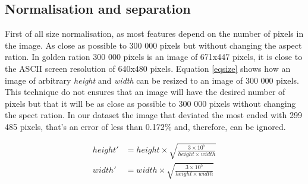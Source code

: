 \documentclass[11pt,a4paper]{report}
\begin{document}
\begin{multicols}{2}

\section{Normalisation and separation}

First of all size normalisation, as most features depend on the number of
pixels in the image.  As close as possible to 300 000 pixels but without
changing the aspect ration.  In golden ration 300 000 pixels is an image of
671x447 pixels, it is close to the ASCII screen resolution of 640x480 pixels.
Equation \ref{eqsize} shows how an image of arbitrary \emph{height} and
\emph{width} can be resized to an image of 300 000 pixels.  This technique do
not ensures that an image will have the desired number of pixels but that it
will be as close as possible to 300 000 pixels without changing the spect
ration.  In our dataset the image that deviated the most ended with 299 485
pixels, that's an error of less than 0.172\% and, therefore, can be ignored.

\begin{equation}
\begin{aligned}
height'  &= height \times \sqrt{ \frac{3 \times 10^5}{height \times width} } \\
width'   &= width  \times \sqrt{ \frac{3 \times 10^5}{height \times width} } \\
\label{eqsize}
\end{aligned}
\end{equation}


\end{multicols}
\end{document}
